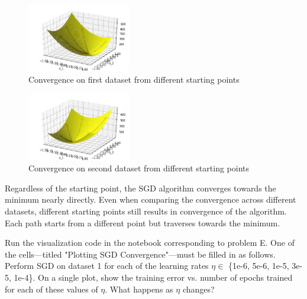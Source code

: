 \begin{solution}
  \begin{figure}[H]
    \centering
    \includegraphics[width=0.4\textwidth]{images/3d_5.png}
    \caption{Convergence on first dataset from different starting points}
    \label{fig:3d_5}
  \end{figure}

  \begin{figure}[H]
    \centering
    \includegraphics[width=0.4\textwidth]{images/3d_6.png}
    \caption{Convergence on second dataset from different starting points}
    \label{fig:3d_6}
  \end{figure}

  Regardless of the starting point, the SGD algorithm converges towards the minimum nearly directly. Even when comparing the convergence across different datasets, different starting points still results in convergence of the algorithm. Each path starts from a different point but traverses towards the minimum.
\end{solution}

\begin{problem}[6]
  Run the visualization code in the notebook corresponding to problem E. One of the cells---titled "Plotting SGD Convergence"---must be filled in as follows. Perform SGD on dataset 1 for each of the learning rates $\eta \in$ \{1e-6, 5e-6, 1e-5, 3e-5, 1e-4\}. On a single plot, show the training error vs. number of epochs trained for each of these values of $\eta$. What happens as $\eta$ changes?
\end{problem}

